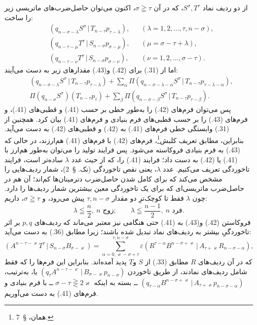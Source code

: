\documentclass[11pt]{article}
\newcommand{\srcLTR}[1]{\relax\ifmmode\text{\mbox{\babelsublr{\foreignlanguage{english}{#1}}}}\else\babelsublr{\foreignlanguage{english}{#1}}\fi}
\providecommand{\pair}[2]{(#1\,|\,#2)}
\providecommand{\eps}{\varepsilon}
\begin{document}
از دو ردیف نماد $S^\sigma,T^\tau$، که در آن $\sigma\geqq\tau$، اکنون می‌توان حاصل‌ضرب‌های ماتریسی زیر را ساخت:
\begin{align}
&\pair{q_{n-\sigma-\lambda}S^\sigma}{T_{n-\tau}p_{\tau-\lambda}}, &&(\lambda=1,2,\ldots,\tau,n-\sigma),\tag{41}\\
&\pair{q_{n-\tau-\mu}T^\tau}{S_{n-\sigma}p_{\sigma-\mu}}, &&(\mu=\sigma-\tau+\lambda),\tag{42}\\
&\pair{q_{n-\tau-\nu}T^\tau}{S_{n-\sigma}p_{\sigma-\nu}}, &&(\nu=1,2,\ldots,\sigma-\tau).
\tag{43}
\end{align}
اما از (31.) برای (42.) و(43.) مقدارهای زیر به دست می‌آیند:
\begin{align}
&\pair{q_{n-\sigma-\lambda}S^\sigma}{T_{n-\tau}p_{\tau-\lambda}}
 +\sum_{\alpha}\Pi\pair{q_{n-\sigma-\lambda-\alpha}S^\sigma}{T_{n-\tau}p_{\tau-\lambda-\alpha}},\tag{42a}\\
&\Pi(q_{n-\sigma}S^\sigma)(T_{n-\tau}p_\tau)
 +\sum_{\beta}\Pi\pair{q_{n-\sigma-\beta}S^\sigma}{T_{n-\tau}p_{\tau-\beta}}.
\tag{43a}
\end{align}
پس می‌توان فرم‌های (42.) را به‌طور خطی بر حسب (41.) و قطبی‌های (41.)، و فرم‌های (43.) را بر حسب قطبی‌های فرم بنیادی و فرم‌های (41.) بیان کرد. همچنین از (31.) وابستگی خطی فرم‌های (41.) به (42.) و قطبی‌های (42.) به دست می‌آید. بنابراین، مطابق تعریف کلبش\footnote{\srcLTR{Clebsch,} همان، \S\ 7.}، فرم‌های (42.) با فرم‌های (41.) هم‌ارزند، در حالی که (43.) به فرم بنیادی فروکاسته می‌شود. پس فرایند تولید را می‌توان به‌طور هم‌ارز با (41.) یا (42.) به دست داد؛ فرایند (41.) را، که از حیث عدد $\lambda$ ساده‌تر است، فرایند تاخوردگی تعریف می‌کنیم. عدد $\lambda$، یعنی نقص تاخوردگی (نک. \S\ 2)، شمار ردیف‌هایی را مشخص می‌کند که برای کامل شدن حاصل‌ضرب دترمینان‌ها کم‌اند؛ آن هم در حاصل‌ضرب ماتریسی‌ای که برای یک تاخوردگی معین بیشترین شمار ردیف‌ها را دارد. چون $\lambda$ فقط تا کوچک‌ترِ دو مقدار $\tau,n-\sigma$ پیش می‌رود، و $\sigma\geqq\tau$، داریم:
\begin{equation}
 \lambda\leqq\frac n2,\ n\text{ زوج};\qquad
 \lambda\leqq\frac{n-1}{2},\ n\text{ فرد}.
\tag{44}
\end{equation}
فروکاستن (42.) و(43.) به (41.) حتی هنگامی نیز معتبر می‌ماند که ردیف‌های $p,q$ بر اثر تاخوردگیِ بیشتر به ردیف‌های نماد تبدیل شده باشند؛ زیرا مطابق (36.) به دست می‌آید:
\[
 \pair{A^{n-\tau-\varkappa}T^\tau}{S_{n-\sigma}B_{\sigma-\varkappa}}
 =\sum_{\alpha=0,\varkappa-\sigma+\tau}^{\tau,n-\sigma}
 \eps\pair{R^{\tau-\alpha}B^{n-\sigma+\varkappa}}{A_{\tau+\varkappa}R_{n-\sigma-\alpha}},
\]
که در آن ردیف‌های $R$ مطابق (33.) از $S$ و$T$ پدید آمده‌اند. بنابراین این فرم‌ها را که فقط شامل ردیف‌های نمادند، از طریق تاخوردن $\pair{q_\tau A^{n-\tau-\varkappa}}{B_{\sigma-\varkappa}p_{n-\sigma}}$ یا، به‌ترتیب، $\pair{q_{\tau-\alpha}B^{n-\sigma+\varkappa}}{A_{\tau+\varkappa}p_{n-\sigma-\alpha}}$ ــ بسته به اینکه $\sigma-\tau\gtreqless 2\varkappa$ ــ با فرم بنیادی و فرم‌های (41.) به دست می‌آوریم.
\end{document}
